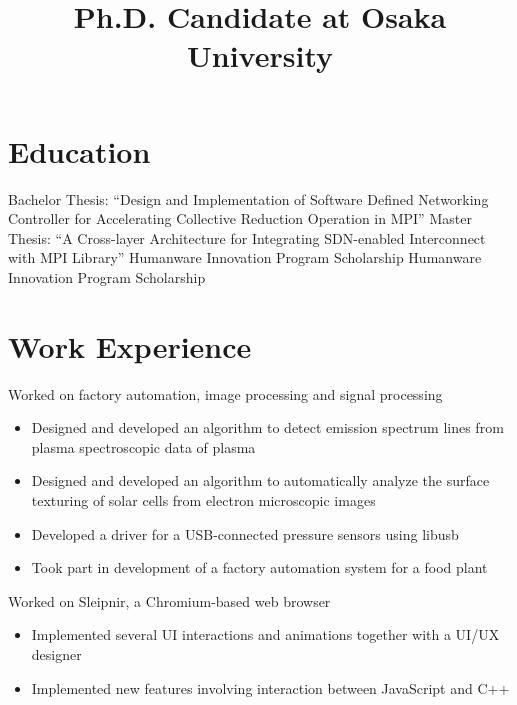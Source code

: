 \documentclass[11pt,a4paper,sans]{moderncv}
\title{Ph.D. Candidate at Osaka University}
\begin{document}
\makecvtitle

\section{Education}
%
{Bachelor Thesis: ``Design and Implementation of Software Defined Networking Controller for Accelerating Collective Reduction Operation in MPI''}
%
{Master Thesis: ``A Cross-layer Architecture for Integrating SDN-enabled
Interconnect with MPI Library''\newline{}%
Humanware Innovation Program Scholarship}
%
{Humanware Innovation Program Scholarship}

\section{Work Experience}

%
{Worked on factory automation, image processing and signal processing%
\begin{itemize}%
\item Designed and developed an algorithm to detect emission spectrum lines
    from plasma spectroscopic data of plasma
\item Designed and developed an algorithm to automatically analyze the
    surface texturing of solar cells from electron microscopic images
\item Developed a driver for a USB-connected pressure sensors using libusb
\item Took part in development of a factory automation system for a food plant
\end{itemize}}

%
{Worked on Sleipnir, a Chromium-based web browser%
\begin{itemize}%
\item Implemented several UI interactions and animations together with a UI/UX designer
\item Implemented new features involving interaction between JavaScript and
    C++
\end{itemize}}
\end{document}
